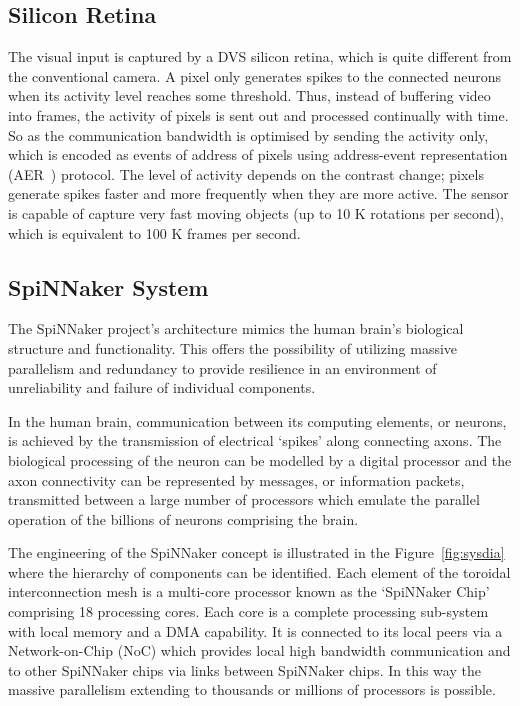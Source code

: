 \documentclass[journal]{journal}
\begin{document}
\subsection{Silicon Retina}
The visual input is captured by a DVS silicon retina, which is quite different from the conventional camera.
A pixel only generates spikes to the connected neurons when its activity level reaches some threshold.
Thus, instead of buffering video into frames, the activity of pixels is sent out and processed continually with time.
So as the communication bandwidth is optimised by sending the activity only, which is encoded as events of address of pixels using address-event representation (AER~\cite{lazzaro1995multi}) protocol.
The level of activity depends on the contrast change\cite{wei2006robust}; pixels generate spikes faster and more frequently when they are more active.
The sensor is capable of capture very fast moving objects (up to 10 K rotations per second), which is equivalent to 100 K frames per second. 

\subsection{SpiNNaker System}
The SpiNNaker project's architecture mimics the human brain's biological structure and functionality. 
This offers the possibility of utilizing massive parallelism and redundancy to provide resilience in an environment of unreliability and failure of individual components.

In the human brain, communication between its computing elements, or neurons, is achieved by the transmission of electrical `spikes' along connecting axons. 
The biological processing of the neuron can be modelled by a digital processor and the axon connectivity can be represented by messages, or information packets, transmitted between a large number of processors which emulate the parallel operation of the billions of neurons comprising the brain.

The engineering of the SpiNNaker concept is illustrated in the Figure~\ref{fig:sysdia} where the hierarchy of components can be identified. 
Each element of the toroidal interconnection mesh is a multi-core processor known as the `SpiNNaker Chip' comprising 18 processing cores. 
Each core is a complete processing sub-system with local memory and a DMA capability. 
It is connected to its local peers via a Network-on-Chip (NoC) which provides local high bandwidth communication and to other SpiNNaker chips via links between SpiNNaker chips. 
In this way the massive parallelism extending to thousands or millions of processors is possible.
\end{document}
